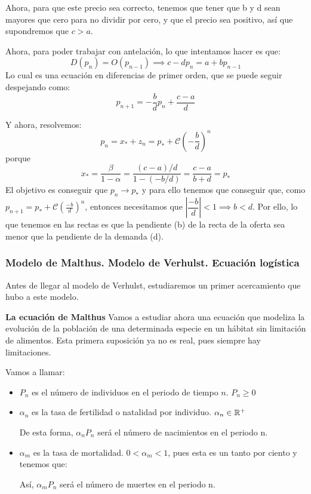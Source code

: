 Ahora, para que este precio sea correcto, tenemos que tener que b y d sean mayores que cero para no dividir por cero, y que el precio sea positivo, así que supondremos que $c> a$.

Ahora, para poder trabajar con antelación, lo que intentamos hacer es que:
\[
D(p_n) = O(p_{n-1}) \implies c-dp_n = a+bp_{n-1}
\]
Lo cual es una ecuación en diferencias de primer orden, que se puede seguir despejando como:
\[
p_{n+1} = -\dfrac{b}{d}p_n+ \dfrac{c-a}{d}
\]

Y ahora, resolvemos:
\[
p_n = x_* + z_n = p_* + \mathcal{C}\left(-\frac{b}{d}\right)^n
\] porque
\[
x_* = \frac{\beta}{1-\alpha} = \frac{(c-a)/d}{1-(-b/d)}= \frac{c-a}{b+d} = p_*
\]
El objetivo es conseguir que $p_n \to p_*$ y para ello tenemos que conseguir que, como $p_{n+1} =p_* + \mathcal{C}(\frac{-b}{d})^n$, entonces necesitamos que $\left|\dfrac{-b}{d}\right| < 1 \implies b < d$.
Por ello, lo que tenemos en las rectas es que la pendiente (b) de la recta de la oferta sea menor que la pendiente de la demanda (d).

\subsubsection{Modelo de Malthus. Modelo de Verhulst. Ecuación logística}

Antes de llegar al modelo de Verhulst, estudiaremos un primer acercamiento que hubo a este modelo.

\textbf{La ecuación de Malthus}
Vamos a estudiar ahora una ecuación que modeliza la evolución de la población de una determinada especie en un hábitat sin limitación de alimentos. Esta primera suposición ya no es real, pues siempre hay limitaciones.

Vamos a llamar:
\begin{itemize}
	\item $P_n$ es el número de individuos en el periodo de tiempo $n$. $P_n\geq 0 $
	\item $\alpha_n$ es la tasa de fertilidad o natalidad por individuo. $\alpha_n \in \mathbb{R}^+$

	De esta forma, $\alpha_n P_n$ será el número de nacimientos en el periodo n.
	\item $\alpha_m$ es la tasa de mortalidad. $0 < \alpha_m < 1$, pues esta es un tanto por ciento y tenemos que:

	Así, $\alpha_m P_n$ será el número de muertes en el periodo n.
\end{itemize}

